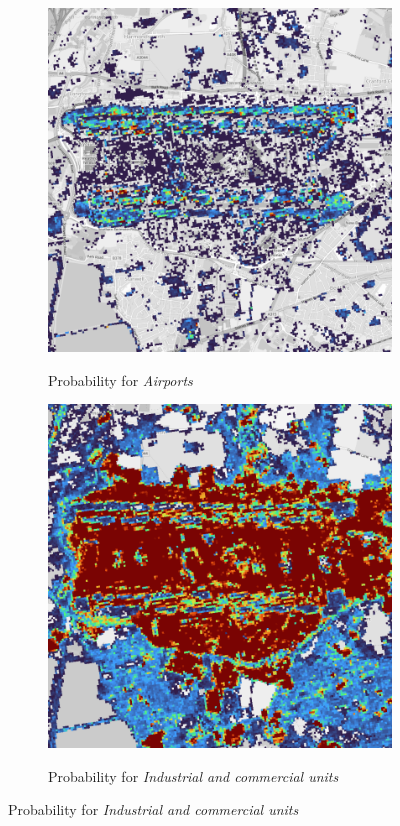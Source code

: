 \begin{figure}[H]
\begin{subfigure}[b]{0.48\textwidth}
        \label{fig:heathrow_corine}
        \end{subfigure}
        \vspace{0.5em}
        \begin{subfigure}[b]{0.48\textwidth}
        \centering
        \caption{Probability for \textit{Airports}}
        \includegraphics[width=\textwidth,height=0.7\textwidth]{figs_06/heathrow_p_airport.png}
        \label{fig:heathrow_airport}
        \end{subfigure}
        \hfill
        \begin{subfigure}[b]{0.48\textwidth}
        \centering
        \caption{Probability for \textit{Industrial and commercial units}}
        \includegraphics[width=\textwidth,height=0.7\textwidth]{figs_06/heathrow_p_industrial_commercial.png}
        \label{fig:heathrow_industrial-commercial}

\end{subfigure}
\end{figure}
